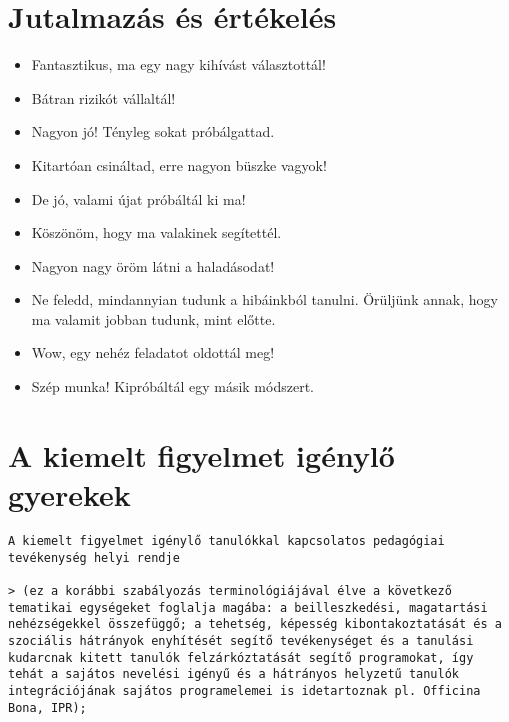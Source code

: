 \section{Jutalmazás és értékelés}
\label{jutalmazas}


\begin{itemize}

      \item
            Fantasztikus, ma egy nagy kihívást választottál!
      \item
            Bátran rizikót vállaltál!
      \item
            Nagyon jó! Tényleg sokat próbálgattad.
      \item
            Kitartóan csináltad, erre nagyon büszke vagyok!
      \item
            De jó, valami újat próbáltál ki ma!
      \item
            Köszönöm, hogy ma valakinek segítettél.
      \item
            Nagyon nagy öröm látni a haladásodat!
      \item
            Ne feledd, mindannyian tudunk a hibáinkból tanulni. Örüljünk annak,
            hogy ma valamit jobban tudunk, mint előtte.
      \item
            Wow, egy nehéz feladatot oldottál meg!
      \item
            Szép munka! Kipróbáltál egy másik módszert.
\end{itemize}

\section{A kiemelt figyelmet igénylő
  gyerekek}\label{sec:kiemelt_figyelem}

\begin{verbatim}
A kiemelt figyelmet igénylő tanulókkal kapcsolatos pedagógiai tevékenység helyi rendje

> (ez a korábbi szabályozás terminológiájával élve a következő tematikai egységeket foglalja magába: a beilleszkedési, magatartási nehézségekkel összefüggő; a tehetség, képesség kibontakoztatását és a szociális hátrányok enyhítését segítő tevékenységet és a tanulási kudarcnak kitett tanulók felzárkóztatását segítő programokat, így tehát a sajátos nevelési igényű és a hátrányos helyzetű tanulók integrációjának sajátos programelemei is idetartoznak pl. Officina Bona, IPR);
\end{verbatim}

